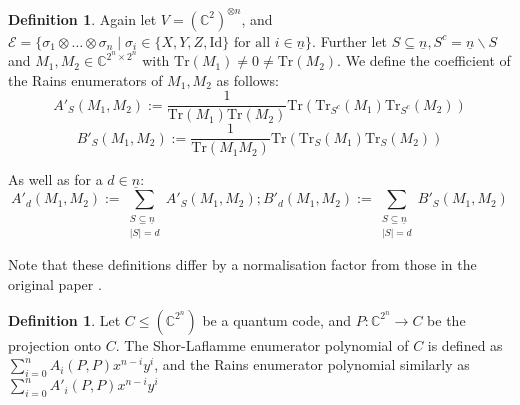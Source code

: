 \documentclass{article}
\def\C{\mathbb{C}}
\def\n{\underline{n}}
\def\fa{\text{ for all }}
\def\Tr{\text{Tr}}
\def\Id{\text{Id}}
\theoremstyle{definition}
\newtheorem{defn}[Satz]{Definition}
\begin{document}
\begin{defn}\label{rains}
Again let $V = (\C^2)^{\otimes n}$, and $\mathcal{E} = \{ \sigma_1 \otimes \ldots \otimes \sigma_n \mid \sigma_i \in \{X,Y,Z,\Id \} \fa i \in \underline{n} \}$. Further let $S \subseteq \underline{n}, S^c = \n \backslash S$ and $M_1, M_2 \in \C^{2^n \times 2^n}$ with $\Tr(M_1) \neq 0 \neq \Tr(M_2)$.
We define the coefficient of the Rains enumerators \cite{rains} of $M_1,M_2$ as follows:
\begin{equation}A'_S(M_1,M_2) := \frac{1}{\Tr(M_1)\Tr(M_2)} \Tr(\Tr_{S^c}(M_1)\Tr_{S^c}(M_2)) \end{equation}
\begin{equation}B'_S(M_1,M_2) := \frac{1}{\Tr(M_1 M_2)} \Tr(\Tr_S(M_1)\Tr_S(M_2)) \end{equation}

As well as for a $d \in \n$: 
\begin{equation} A'_d(M_1,M_2) := \sum_{\substack{ S \subseteq \underline{n} \\ |S| = d}} A'_S(M_1,M_2) ; B'_d(M_1,M_2) := \sum_{\substack{ S \subseteq \underline{n} \\ |S| = d}} B'_S(M_1,M_2) \end{equation}
\end{defn}
Note that these definitions differ by a normalisation factor from those in the original paper \cite{rains}.

\begin{defn}
Let $C \leq (\C^{2^n})$ be a quantum code, and $P: \C^{2^n} \rightarrow C$ be the projection onto $C$. 
The Shor-Laflamme enumerator polynomial of $C$ is defined as $ \sum_{i=0}^n A_i(P,P) x^{n-i}y^i$, and the Rains enumerator polynomial similarly as  $\sum_{i=0}^n A'_i(P,P) x^{n-i}y^i$
\end{defn}
\end{document}
